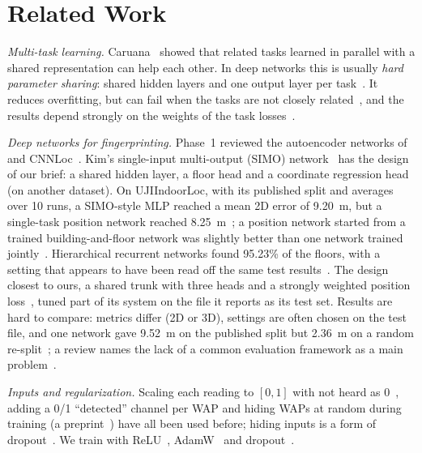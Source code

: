 \section{Related Work}\label{sec:related}

\emph{Multi-task learning.} Caruana~\cite{caruana1997multitask} showed that
related tasks learned in parallel with a shared representation can help each
other. In deep networks this is usually \emph{hard parameter sharing}: shared
hidden layers and one output layer per task~\cite{ruder2017overview}. It
reduces overfitting, but can fail when the tasks are not closely
related~\cite{ruder2017overview}, and the results depend strongly on the
weights of the task losses~\cite{kendall2018multi}.

\emph{Deep networks for fingerprinting.} Phase~1 reviewed the autoencoder
networks of~\cite{nowicki2017loweffort,kim2018scalable} and
CNNLoc~\cite{song2019cnnloc}. Kim's single-input multi-output (SIMO)
network~\cite{kim2018simo} has the design of our brief: a shared hidden layer, a
floor head and a coordinate regression head (on another dataset). On
UJIIndoorLoc, with its published split and averages over 10 runs, a SIMO-style
MLP reached a mean 2D error of 9.20~m, but a single-task position network
reached 8.25~m~\cite{laska2022multitask}; a position network started from a
trained building-and-floor network was slightly better than one network
trained jointly~\cite{li2025hierarchical}. Hierarchical recurrent networks
found 95.23\% of the floors, with a setting that appears to have been read off
the same test results~\cite{elesawi2021hierarchical}. The design closest to ours, a shared
trunk with three heads and a strongly weighted position
loss~\cite{li2026hybrid}, tuned part of its system on the file it reports as
its test set. Results are hard to compare: metrics differ (2D or 3D),
settings are often chosen on the test file, and one network gave 9.52~m on the
published split but 2.36~m on a random re-split~\cite{kargarbarzi2024edge}; a
review names the lack of a common evaluation framework as a main
problem~\cite{alhomayani2020deep}.

\emph{Inputs and regularization.} Scaling each reading to $[0,1]$ with not
heard as 0~\cite{kargarbarzi2024edge,li2026hybrid}, adding a 0/1 ``detected''
channel per WAP and hiding WAPs at random during training (a
preprint~\cite{eftekharizadeh2026physics}) have all been used before; hiding
inputs is a form of dropout~\cite{srivastava2014dropout}. We train with
ReLU~\cite{nair2010rectified,goodfellow2016deep}, AdamW~\cite{kingma2015adam,%
loshchilov2019decoupled} and dropout~\cite{srivastava2014dropout}.

